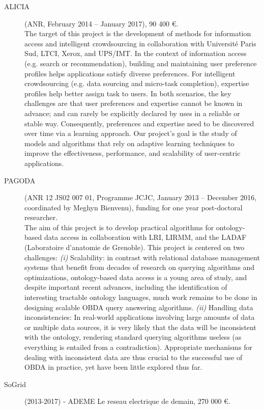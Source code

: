 \begin{description}
\item[ALICIA] (ANR, February 2014 -- January 2017), 90 400 \euro. \\
The target of this project is the development of methods for information access and intelligent crowdsourcing in collaboration with Université Paris Sud, LTCI, Xerox, and UPS/IMT. In the context of information access (e.g. search or recommendation), building and maintaining user preference profiles helps applications satisfy diverse preferences. For intelligent crowdsourcing (e.g. data sourcing and micro-task completion), expertise profiles help better assign task to users. In both scenarios, the key challenges are that user preferences and expertise cannot be known in advance; and can rarely be explicitly declared by uses in a reliable or stable way. Consequently, preferences and expertise need to be discovered over time via a learning approach. Our project’s goal is the study of models and algorithms that rely on adaptive learning techniques to improve the effectiveness, performance, and scalability of user-centric applications.

\item[PAGODA] (ANR 12 JS02 007 01, Programme JCJC, January 2013 -- December 2016, coordinated by Meghyn Bienvenu), funding for one year post-doctoral researcher. \\
The aim of this project is to develop practical algorithms for ontology-based data access in collaboration with LRI, LIRMM, and the LADAF (Laboratoire d’anatomie de Grenoble). This project is centered on two challenges:
\textit{(i)} Scalability: in contrast with relational database management systems that benefit from decades of research on querying algorithms and optimizations, ontology-based data access is a young area of study, and despite important recent advances, including the identification of interesting tractable ontology languages, much work remains to be done in designing scalable OBDA query answering algorithms.
\textit{(ii)} Handling data inconsistencies: In real-world applications involving large amounts of data or multiple data sources, it is very likely that the data will be inconsistent with the ontology, rendering standard querying algorithms useless (as everything is entailed from a contradiction). Appropriate mechanisms for dealing with inconsistent data are thus crucial to the successful use of OBDA in practice, yet have been little explored thus far.


\item[SoGrid]  (2013-2017) - ADEME Le reseau  electrique de demain, 270 000 \euro.


\end{description}
